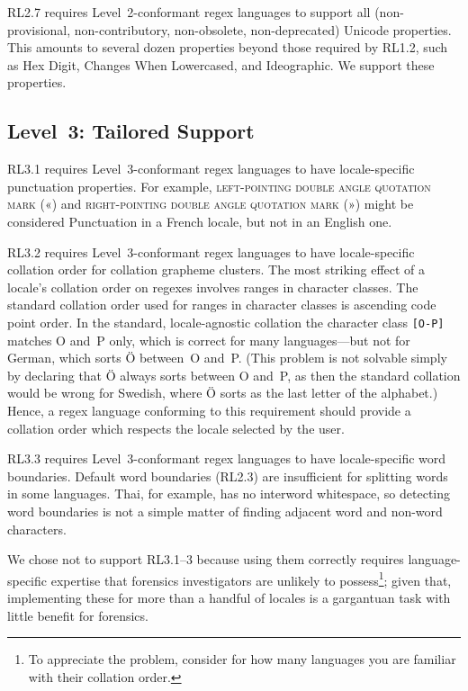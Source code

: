 \documentclass[5p,final,number,sort&compress]{elsarticle}
\newcommand{\re}[1]{\texttt{#1}}
\begin{document}
RL2.7 requires Level~2-conformant regex languages to support all (non-provisional, non-contributory, non-obso\-lete, non-deprecated) Unicode properties. This amounts to several dozen properties beyond those required by RL1.2, such as Hex Digit, Changes When Lowercased, and Ideographic. We support these properties.

\subsection{Level~3: Tailored Support}

RL3.1 requires Level~3-conformant regex languages to have locale-specific punctuation properties. For example, \textsc{left-pointing double angle quotation mark} («) and \textsc{right-pointing double angle quotation mark} (») might be considered Punctuation in a French locale, but not in an English one.

RL3.2 requires Level~3-conformant regex languages to have locale-specific collation order for collation grapheme clusters. The most striking effect of a locale's collation order on regexes involves ranges in character classes. The standard collation order used for ranges in character classes is ascending code point order. In the standard, locale-agnostic collation the character class \re{[O-P]} matches O and~P only, which is correct for many languages---but not for German, which sorts \"O between~O and~P. (This problem is not solvable simply by declaring that \"O always sorts between O and~P, as then the standard collation would be wrong for Swedish, where \"O sorts as the last letter of the alphabet.)  Hence, a regex language conforming to this requirement should provide a collation order which respects the locale selected by the user.

RL3.3 requires Level~3-conformant regex languages to have locale-specific word boundaries. Default word boundaries (RL2.3) are insufficient for splitting words in some languages. Thai, for example, has no interword whitespace, so detecting word boundaries is not a simple matter of finding adjacent word and non-word characters.

We chose not to support RL3.1--3 because using them correctly requires language-specific expertise that forensics investigators are unlikely to possess\footnote{To appreciate the problem, consider for how many languages you are familiar with their collation order.}; given that, implementing these for more than a handful of locales is a gargantuan task with little benefit for forensics.
\end{document}
